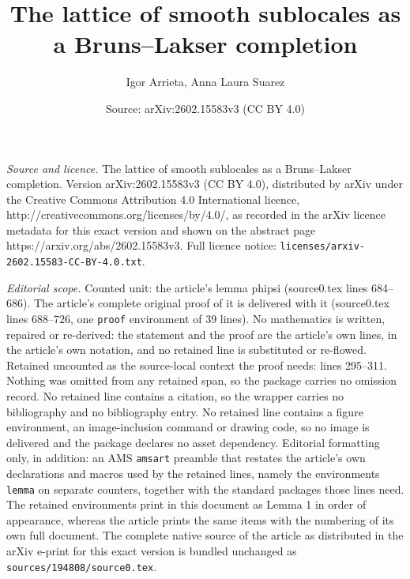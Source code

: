 \documentclass[10pt,a4paper]{amsart}
\title{The lattice of smooth sublocales as a Bruns--Lakser completion}
\author{Igor Arrieta, Anna Laura Suarez}
\date{Source: arXiv:2602.15583v3 (CC BY 4.0)}
\begin{document}
\maketitle

\noindent\emph{Source and licence.} The lattice of smooth sublocales as a Bruns--Lakser completion. Version arXiv:2602.15583v3 (CC BY 4.0), distributed by arXiv under the Creative Commons Attribution 4.0 International licence, http://creativecommons.org/licenses/by/4.0/, as recorded in the arXiv licence metadata for this exact version and shown on the abstract page https://arxiv.org/abs/2602.15583v3. Full licence notice: \texttt{licenses/arxiv-2602.15583-CC-BY-4.0.txt}.\par\smallskip

\noindent\textit{Editorial scope.} Counted unit: the article's lemma phipsi (source0.tex lines 684--686). The article's complete original proof of it is delivered with it (source0.tex lines 688--726, one \texttt{proof} environment of 39 lines). No mathematics is written, repaired or re-derived: the statement and the proof are the article's own lines, in the article's own notation, and no retained line is substituted or re-flowed.  Retained uncounted as the source-local context the proof needs: lines 295--311.  Nothing was omitted from any retained span, so the package carries no omission record.  No retained line contains a citation, so the wrapper carries no bibliography and no bibliography entry.  No retained line contains a figure environment, an image-inclusion command or drawing code, so no image is delivered and the package declares no asset dependency.  Editorial formatting only, in addition: an AMS \texttt{amsart} preamble that restates the article's own declarations and macros used by the retained lines, namely the environments \texttt{lemma} on separate counters, together with the standard packages those lines need.  The retained environments print in this document as Lemma 1 in order of appearance, whereas the article prints the same items with the numbering of its own full document.  The complete native source of the article as distributed in the arXiv e-print for this exact version is bundled unchanged as \texttt{sources/194808/source0.tex}.
\end{document}
